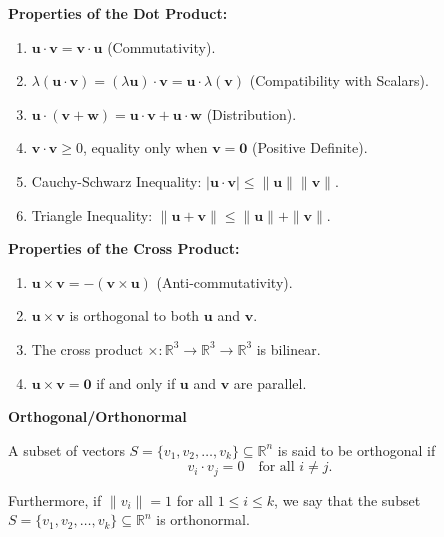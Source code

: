 \documentclass{article}
\begin{document}
\begin{minipage}[t]{0.5\textwidth}
\textbf{Properties of the Dot Product:}

\begin{enumerate}
    \item \( \bm{u} \cdot \bm{v} = \bm{v} \cdot \bm{u} \) (Commutativity).
    \item \( \lambda(\bm{u} \cdot \bm{v}) = (\lambda \bm{u}) \cdot \bm{v} = \bm{u} \cdot \lambda(\bm{v}) \) (Compatibility with Scalars).
    \item \( \bm{u} \cdot (\bm{v} + \bm{w}) = \bm{u} \cdot \bm{v} + \bm{u} \cdot \bm{w} \) (Distribution).
    \item \( \bm{v} \cdot \bm{v} \geq 0 \), equality only when \( \bm{v} = \bm{0} \) (Positive Definite).
    \item Cauchy-Schwarz Inequality: \( |\bm{u} \cdot \bm{v}| \leq \|\bm{u}\| \|\bm{v}\| \).
    \item Triangle Inequality: \( \|\bm{u} + \bm{v}\| \leq \|\bm{u}\| + \|\bm{v}\| \).
\end{enumerate}
\end{minipage}
\hfill
\begin{minipage}[t]{0.5\textwidth}
\textbf{Properties of the Cross Product:}

\begin{enumerate}
    \item \( \bm{u} \times \bm{v} = -(\bm{v} \times \bm{u}) \) (Anti-commutativity).
    \item \( \bm{u} \times \bm{v} \) is orthogonal to both \( \bm{u} \) and \( \bm{v} \).
    \item The cross product \( \times : \mathbb{R}^3 \rightarrow \mathbb{R}^3 \rightarrow \mathbb{R}^3 \) is bilinear.
    \item \( \bm{u} \times \bm{v} = \bm{0} \) if and only if \( \bm{u} \) and \( \bm{v} \) are parallel.
\end{enumerate}
\end{minipage}

\vspace{0.5cm}

\noindent \textbf{Orthogonal/Orthonormal}

A subset of vectors \( S = \{v_1, v_2, \ldots, v_k\} \subseteq \mathbb{R}^n \) is said to be orthogonal if
\[ v_i \cdot v_j = 0 \quad \text{for all } i \neq j. \]

Furthermore, if \( \|v_i\| = 1 \) for all \( 1 \leq i \leq k \), we say that the subset \( S = \{v_1, v_2, \ldots, v_k\} \subseteq \mathbb{R}^n \)
is orthonormal.
\end{document}
